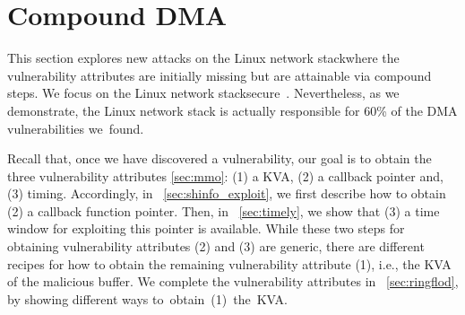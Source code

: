 \section{Compound DMA \DIFdelbegin {}\DIFdelend \DIFaddbegin {}\DIFaddend }\label{sec:linux_net}



This section explores new attacks on the Linux network stack\DIFaddbegin \DIFadd{, }\DIFaddend where the vulnerability attributes are initially missing but are attainable via compound steps.
We focus on the Linux network stack\DIFdelbegin {}\DIFdelend \DIFaddbegin {}\DIFaddend secure~\cite{thunder}.
Nevertheless, as we demonstrate, the Linux network stack is actually responsible for 60\% of the DMA vulnerabilities \mbox{we \DIFdelbegin {}\DIFdelend found.}

Recall that, once we have discovered a \subpage{} vulnerability, our goal is to obtain the three vulnerability attributes \DIFdelbegin {}\DIFdelend \DIFaddbegin {}\DIFaddend \ref{sec:mmo}: (1) a KVA, (2) a callback pointer and, (3) timing\DIFdelbegin \DIFdel{)}\DIFdelend . 
Accordingly, in \DIFdelbegin {}\DIFdelend \DIFaddbegin {}\DIFaddend ~\ref{sec:shinfo_exploit}, we first describe how to obtain (2) a callback function pointer. Then, in \DIFdelbegin {}\DIFdelend \DIFaddbegin {}\DIFaddend ~\ref{sec:timely}, we show that (3) a time window for exploiting this pointer is available. 
While these two steps for obtaining vulnerability attributes (2) and (3) are generic, there are different recipes for how to obtain the remaining vulnerability attribute (1), i.e., the KVA of the malicious buffer.
We complete the vulnerability attributes in \DIFdelbegin {}\DIFdelend \DIFaddbegin {}\DIFaddend ~\ref{sec:ringflod}, \DIFdelbegin {}\DIFdelend \DIFaddbegin {}\DIFaddend by showing different ways \DIFdelbegin {}\DIFdelend \mbox{to obtain (1) the KVA.}



